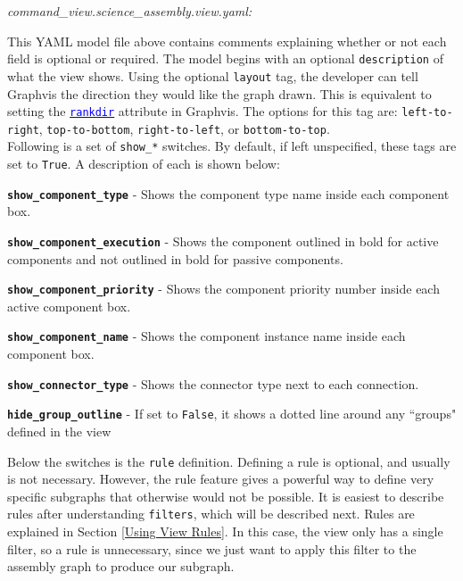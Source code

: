 \textit{command\_view.science\_assembly.view.yaml:}

This YAML model file above contains comments explaining whether or not each field is optional or required. The model begins with an optional \texttt{description} of what the view shows. Using the optional \texttt{layout} tag, the developer can tell Graphvis the direction they would like the graph drawn. This is equivalent to setting the \href{https://www.graphviz.org/doc/info/attrs.html#d:rankdir}{\textcolor{blue}{\texttt{rankdir}}} attribute in Graphvis. The options for this tag are: \texttt{left-to-right}, \texttt{top-to-bottom}, \texttt{right-to-left}, or \texttt{bottom-to-top}. \\

Following is a set of \texttt{show\_*} switches. By default, if left unspecified, these tags are set to \texttt{True}. A description of each is shown below:

\vspace{5mm} %
\begin{spaceditemize}
  \item \textbf{\texttt{show\_component\_type}} - Shows the component type name inside each component box.
  \item \textbf{\texttt{show\_component\_execution}} - Shows the component outlined in bold for active components and not outlined in bold for passive components.
  \item \textbf{\texttt{show\_component\_priority}} - Shows the component priority number inside each active component box.
  \item \textbf{\texttt{show\_component\_name}} - Shows the component instance name inside each component box.
  \item \textbf{\texttt{show\_connector\_type}} - Shows the connector type next to each connection.
  \item \textbf{\texttt{hide\_group\_outline}} - If set to \texttt{False}, it shows a dotted line around any ``groups" defined in the view
\end{spaceditemize}
\vspace{5mm} %

Below the switches is the \texttt{rule} definition. Defining a rule is optional, and usually is not necessary. However, the rule feature gives a powerful way to define very specific subgraphs that otherwise would not be possible. It is easiest to describe rules after understanding \texttt{filters}, which will be described next. Rules are explained in Section \ref{Using View Rules}. In this case, the view only has a single filter, so a rule is unnecessary, since we just want to apply this filter to the assembly graph to produce our subgraph. \\

